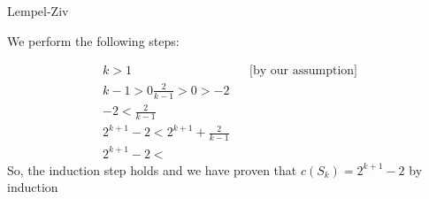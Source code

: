 \documentclass[11pt, nopagenumbers]{adamblan-hw}
\begin{document}
\begin{question}{\color{red} Lempel-Ziv}
\pagebreak
\begin{part}
We perform the following steps:

\begin{align*}
k > 1 && \text{[by our assumption]}\\
k - 1 > 0
\frac{2}{k - 1} > 0 > -2\\
-2 < \frac{2}{k - 1} \\
2^{k + 1} - 2 < 2^{k + 1} + \frac{2}{k - 1} \\
2^{k + 1} - 2 <
\end{align*}
So, the induction step holds and we have proven that $c(S_k) = 2^{k + 1} - 2$ by induction
\end{part}

\begin{part}
\end{part}

\begin{part}
\end{part}

\begin{part}
\end{part}

\begin{part}
\end{part}
    

\end{question}
\end{document}
